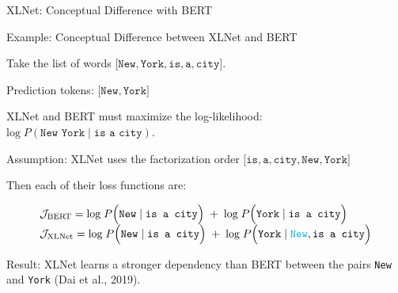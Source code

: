 % 
%     
%         
%     


\begin{frame}{XLNet: Conceptual Difference with BERT}

    \vspace{20pt}
    
    \begin{exampleBlock}{Example: Conceptual Difference between XLNet and BERT}
    

    Take the list of words $\Big[ \texttt{New}, \texttt{York}, \texttt{is}, \texttt{a}, \texttt{city} \Big]$. 
    
    Prediction tokens: $\Big[ \texttt{New}, \texttt{York} \Big]$ 
    
    XLNet and BERT must maximize the log-likelihood: $\text{log} \; P(\texttt{New York} \; | \; \texttt{is a city})$. 
    
    Assumption: XLNet uses the factorization order $\Big[ \texttt{is}, \texttt{a}, \texttt{city}, \texttt{New}, \texttt{York} \Big]$
    
    Then each of their loss functions are: 
    
    \begin{equation}
    \begin{array}{ll}
    \mathcal{J}_\text{BERT} = \text{log} \; P \Big( \texttt{New} \; | \; \texttt{is a city} \Big) \; + \; \text{log} \; P \Big( \texttt{York} \; | \; \texttt{is a city} \Big) \\
    \mathcal{J}_\text{XLNet} = \text{log} \; P \Big( \texttt{New} \; | \; \texttt{is a city} \Big) \; + \; \text{log} \; P \Big( \texttt{York} \; | \; {\color{cyan} \texttt{New}}, \texttt{is a city} \Big) 
    \end{array}
    \end{equation}
    
    Result: XLNet learns a stronger dependency than BERT between the pairs \texttt{New} and \texttt{York} (Dai et al., 2019). 
    
    \end{exampleBlock}
    
\end{frame}